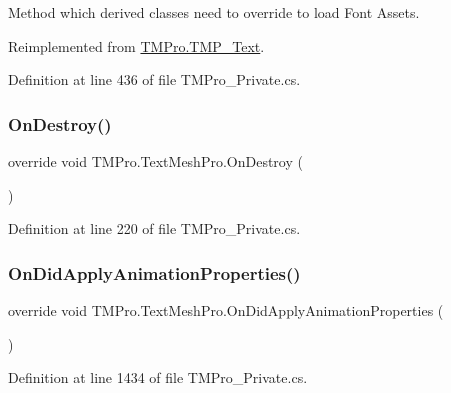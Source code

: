 Method which derived classes need to override to load Font Assets. 



Reimplemented from \mbox{\hyperlink{class_t_m_pro_1_1_t_m_p___text_a02b60cb23d3eceb1ea52a61f194d8bec}{T\+M\+Pro.\+T\+M\+P\+\_\+\+Text}}.



Definition at line 436 of file T\+M\+Pro\+\_\+\+Private.\+cs.

\mbox{\label{class_t_m_pro_1_1_text_mesh_pro_a158269bbde6633eb1a5621203f518e87}} 
\subsubsection{\texorpdfstring{OnDestroy()}{OnDestroy()}}
{\footnotesize\ttfamily override void T\+M\+Pro.\+Text\+Mesh\+Pro.\+On\+Destroy (\begin{DoxyParamCaption}{ }\end{DoxyParamCaption})\hspace{0.3cm}{\ttfamily [protected]}}



Definition at line 220 of file T\+M\+Pro\+\_\+\+Private.\+cs.

\mbox{\label{class_t_m_pro_1_1_text_mesh_pro_a63606af11bff27b7a0f6354c8568815b}} 
\subsubsection{\texorpdfstring{OnDidApplyAnimationProperties()}{OnDidApplyAnimationProperties()}}
{\footnotesize\ttfamily override void T\+M\+Pro.\+Text\+Mesh\+Pro.\+On\+Did\+Apply\+Animation\+Properties (\begin{DoxyParamCaption}{ }\end{DoxyParamCaption})\hspace{0.3cm}{\ttfamily [protected]}}



Definition at line 1434 of file T\+M\+Pro\+\_\+\+Private.\+cs.

